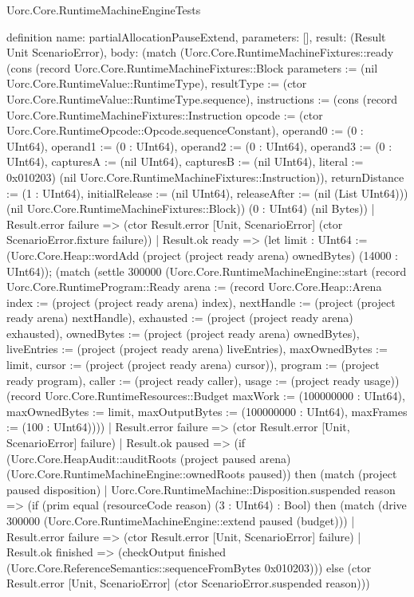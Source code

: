 \begin{lexlean}{Uorc.Core.RuntimeMachineEngineTests}
\begin{semanticmodule}
definition{
  name: partialAllocationPauseExtend,
  parameters: [],
  result: (Result Unit ScenarioError),
  body: (match (Uorc.Core.RuntimeMachineFixtures::ready (cons (record Uorc.Core.RuntimeMachineFixtures::Block {parameters := (nil Uorc.Core.RuntimeValue::RuntimeType), resultType := (ctor Uorc.Core.RuntimeValue::RuntimeType.sequence), instructions := (cons (record Uorc.Core.RuntimeMachineFixtures::Instruction {opcode := (ctor Uorc.Core.RuntimeOpcode::Opcode.sequenceConstant), operand0 := (0 : UInt64), operand1 := (0 : UInt64), operand2 := (0 : UInt64), operand3 := (0 : UInt64), capturesA := (nil UInt64), capturesB := (nil UInt64), literal := 0x010203}) (nil Uorc.Core.RuntimeMachineFixtures::Instruction)), returnDistance := (1 : UInt64), initialRelease := (nil UInt64), releaseAfter := (nil (List UInt64))}) (nil Uorc.Core.RuntimeMachineFixtures::Block)) (0 : UInt64) (nil Bytes))
    | Result.error failure => (ctor Result.error [Unit, ScenarioError] (ctor ScenarioError.fixture failure))
    | Result.ok ready => (let limit : UInt64 := (Uorc.Core.Heap::wordAdd (project (project ready arena) ownedBytes) (14000 : UInt64)); (match (settle 300000 (Uorc.Core.RuntimeMachineEngine::start (record Uorc.Core.RuntimeProgram::Ready {arena := (record Uorc.Core.Heap::Arena {index := (project (project ready arena) index), nextHandle := (project (project ready arena) nextHandle), exhausted := (project (project ready arena) exhausted), ownedBytes := (project (project ready arena) ownedBytes), liveEntries := (project (project ready arena) liveEntries), maxOwnedBytes := limit, cursor := (project (project ready arena) cursor)}), program := (project ready program), caller := (project ready caller), usage := (project ready usage)}) (record Uorc.Core.RuntimeResources::Budget {maxWork := (100000000 : UInt64), maxOwnedBytes := limit, maxOutputBytes := (100000000 : UInt64), maxFrames := (100 : UInt64)})))
      | Result.error failure => (ctor Result.error [Unit, ScenarioError] failure)
      | Result.ok paused => (if (Uorc.Core.HeapAudit::auditRoots (project paused arena) (Uorc.Core.RuntimeMachineEngine::ownedRoots paused)) then (match (project paused disposition)
        | Uorc.Core.RuntimeMachine::Disposition.suspended reason => (if (prim equal (resourceCode reason) (3 : UInt64) : Bool) then (match (drive 300000 (Uorc.Core.RuntimeMachineEngine::extend paused (budget)))
          | Result.error failure => (ctor Result.error [Unit, ScenarioError] failure)
          | Result.ok finished => (checkOutput finished (Uorc.Core.ReferenceSemantics::sequenceFromBytes 0x010203))) else (ctor Result.error [Unit, ScenarioError] (ctor ScenarioError.suspended reason)))
}
\end{semanticmodule}
\end{lexlean}
